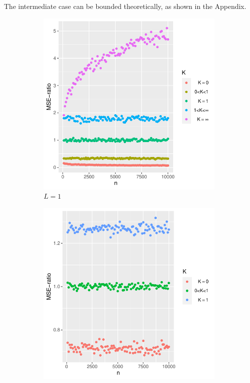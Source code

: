 \documentclass[ejs, twoside]{imsart}
\theoremstyle{plain}
\theoremstyle{remark}
\numberwithin{equation}{section}
\numberwithin{table}{section}
\numberwithin{figure}{section}
\begin{document}
The intermediate case can be bounded theoretically, as shown in the Appendix.



\begin{figure}
	\centering
	\begin{subfigure}{0.3\textwidth}
		\includegraphics[width=\textwidth]{mseratio/mseratioa.pdf}
		\caption{\(L = 1\)}
	\end{subfigure}
	\hfill
	\begin{subfigure}{0.3\textwidth}
		\includegraphics[width=\textwidth]{mseratio/mseratiob.pdf}

\end{subfigure}
\end{figure}
\end{document}
